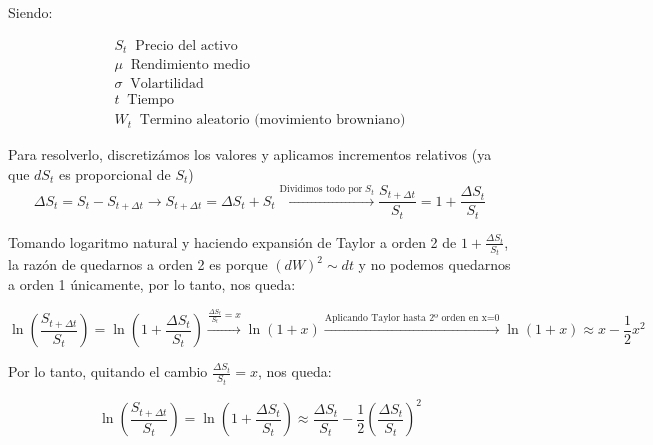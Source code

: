 \documentclass[12pt,a4paper]{article}
\begin{document}
Siendo:

\begin{equation*}
\begin{matrix}
 S_{t} \;\; \textrm{Precio del activo} \;\;\;\;\;\;\;\;\;\;\;\;\;\;\;\;\;\;\;\;\;\;\;\;\;\;\;\;\;\;\;\;\;\;\;\;\;\;\;\; \\
 \mu \;\; \textrm{Rendimiento medio} \;\;\;\;\;\;\;\;\;\;\;\;\;\;\;\;\;\;\;\;\;\;\;\;\;\;\;\;\;\;\;\;\;\;\;\;\;\\
 \sigma \;\; \textrm{Volartilidad} \;\;\;\;\;\;\;\;\;\;\;\;\;\;\;\;\;\;\;\;\;\;\;\;\;\;\;\;\;\;\;\;\;\;\;\;\;\;\;\;\;\;\;\;\;\;\;\;\;\\
 t \;\; \textrm{Tiempo} \;\;\;\;\;\;\;\;\;\;\;\;\;\;\;\;\;\;\;\;\;\;\;\;\;\;\;\;\;\;\;\;\;\;\;\;\;\;\;\;\;\;\;\;\;\;\;\;\;\;\;\;\;\;\;\; \\
 W_{t} \;\; \textrm{Termino aleatorio (movimiento browniano)}
\end{matrix}
\end{equation*}

Para resolverlo, discretizámos los valores y aplicamos incrementos relativos (ya que $dS_{t}$ es proporcional de $S_{t}$)
\begin{equation}
\Delta S_{t} = S_{t} - S_{t+ \Delta t} \to S_{t+ \Delta t} = \Delta S_{t} + S_{t}\xrightarrow{\textrm{Dividimos todo por} \; S_{t}} \frac{S_{t+ \Delta t}}{S_{t}} = 1+\frac{\Delta S_{t}}{S_{t}}
\end{equation}

Tomando logaritmo natural y haciendo expansión de Taylor a orden 2 de $ 1+\frac{\Delta S_{t}}{S_{t}} $, la razón de quedarnos a orden 2 es porque $\left ( dW \right )^{2} \sim dt$ y no podemos quedarnos a orden 1 únicamente, por lo tanto, nos queda:

\begin{equation}
\ln \left (  \frac{S_{t+ \Delta t}}{S_{t}} \right ) = \ln \left ( 1+\frac{\Delta S_{t}}{S_{t}} \right ) \xrightarrow{\frac{\Delta S_{t}}{S_{t}}=x} \ln (1+x) \xrightarrow{\textrm{Aplicando Taylor hasta 2º orden  en x=0}} \ln(1+x) \approx  x- \frac{1}{2} x^{2}
\end{equation}

Por lo tanto, quitando el cambio $\frac{\Delta S_{t}}{S_{t}}=x$,  nos queda:

\begin{equation}
\ln \left (  \frac{S_{t+ \Delta t}}{S_{t}} \right ) = \ln \left ( 1+\frac{\Delta S_{t}}{S_{t}} \right ) \approx  \frac{\Delta S_{t}}{S_{t}} - \frac{1}{2} \left (  \frac{\Delta S_{t}}{S_{t}} \right )^{2}
\end{equation}
\end{document}
